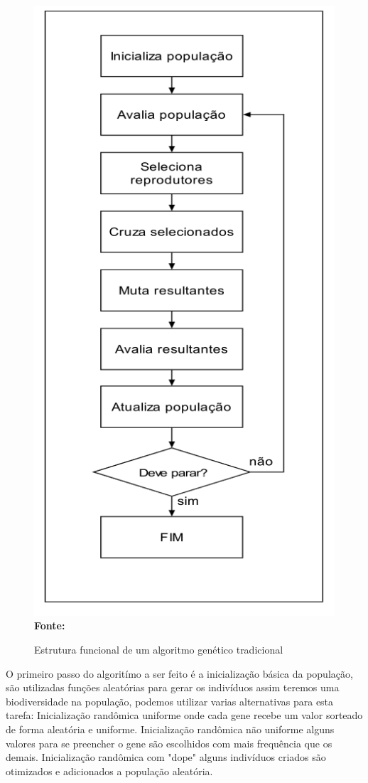 \documentclass{abntpuc}
\begin{document}
\begin{figure}[!htb]
\caption[Estrutura funcional de um algoritmo genético tradicional]{Estrutura funcional de um algoritmo genético tradicional}
\label{fig:ag}
\centering
\includegraphics[scale=0.4]{imagens/ag.png}
\\ \textbf{\footnotesize Fonte: \cite{lucas2000algoritmos}}
\end{figure}



O primeiro passo do algoritímo a ser feito é a inicialização básica da população, são utilizadas funções aleatórias para gerar os indivíduos assim teremos uma biodiversidade na população, podemos utilizar varias alternativas para esta tarefa: Inicialização randômica uniforme onde cada gene recebe um valor sorteado de forma aleatória e uniforme. Inicialização randômica não uniforme alguns valores para se preencher o gene são escolhidos com mais frequência que os demais. Inicialização randômica com "dope" alguns indivíduos criados são otimizados e adicionados a população aleatória.
\end{document}
